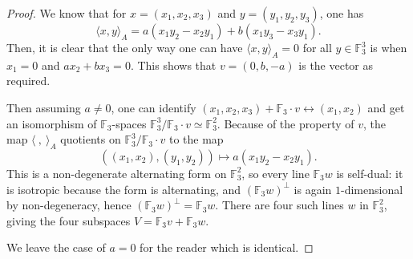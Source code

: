 \documentclass{eptcs}
\theoremstyle{remark}
\theoremstyle{definition}
\begin{document}
\begin{proof}
    We know that for $x=(x_{1},x_{2},x_{3})$ and $y=(y_{1},y_{2},y_{3})$, one has
\begin{equation}
    \langle x,y \rangle_{A} = a(x_{1} y_{2} - x_{2} y_{1}) + b (x_{1} y_{3} - x_{3} y_{1}).
\end{equation}
Then, it is clear that the only way one can have $\langle x, y \rangle_{A} = 0$ for all $y \in \mathbb{F}_{3}^{3}$ is when $x_{1} = 0$ and $a x_{2} + b x_{3} = 0$. This shows that $v = (0,b,-a)$ is the vector as required.

Then assuming $a \neq 0$, one can identify $(x_{1}, x_{2},x_{3}) + \mathbb{F}_{3} \cdot v \leftrightarrow (x_{1},x_{2})$ and get an isomorphism of $\mathbb{F}_{3}$-spaces ${\mathbb{F}_{3}^{3}}/{ \mathbb{F}_{3} \cdot v } \simeq \mathbb{F}_{3}^{2}$. Because of the property of $v$, the map $\langle \ , \ \rangle_{A}$ quotients on $\mathbb{F}_{3}^{3} / \mathbb{F}_{3} \cdot v$ to the map
\begin{equation}
    ( (x_{1},x_{2}), (y_{1},y_{2}))  \mapsto  a(x_{1} y_{2} - x_{2} y_{1}).
\end{equation}
This is a non-degenerate alternating form on $\mathbb{F}_{3}^{2}$, so every line $\mathbb{F}_{3} w$ is self-dual: it is isotropic because the form is alternating, and $(\mathbb{F}_{3}w)^{\perp}$ is again $1$-dimensional by non-degeneracy, hence $(\mathbb{F}_{3}w)^{\perp} = \mathbb{F}_{3}w$. There are four such lines $w$ in $\mathbb{F}_{3}^{2}$, giving the four subspaces $V = \mathbb{F}_{3} v + \mathbb{F}_{3} w$.

We leave the case of $a=0$ for the reader which is identical.
\end{proof}
\end{document}
